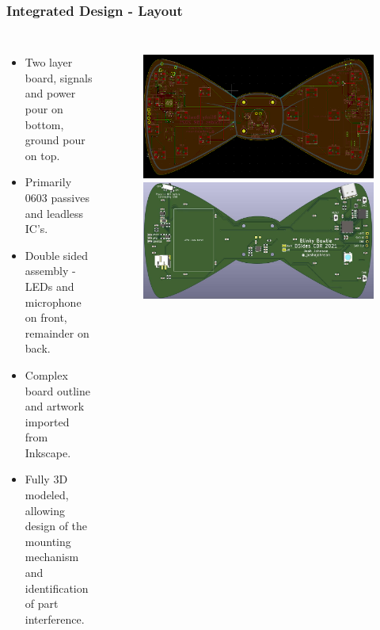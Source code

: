 \documentclass[aspectratio=169, t]{beamer}
\begin{document}
\begin{frame}
\frametitle{Integrated Design - Layout}
\vspace{-5mm}
\begin{columns}
	\begin{itemize}
		\item Two layer board, signals and power pour on bottom, ground pour on top.
		\item Primarily 0603 passives and leadless IC's.
		\item Double sided assembly - LEDs and microphone on front, remainder on back.
		\item Complex board outline and artwork imported from Inkscape.
		\item Fully 3D modeled, allowing design of the mounting mechanism and identification of part interference.
	\end{itemize}
	\begin{figure}
		\includegraphics[width=0.9\linewidth]{images/bowtie-layout.png}
		\includegraphics[width=0.9\linewidth]{images/bowtie-render.jpg}
	\end{figure}
\end{columns}
\end{frame}
\end{document}
